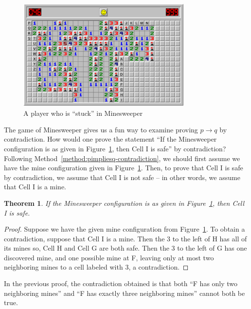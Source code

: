 \documentclass{book}
\newcounter{ekcounter}%
\theoremstyle{ekimcustom}
\newtheorem{theorem}[ekcounter]{Theorem}
\begin{document}
\begin{figure}[hbt]
\begin{center}
\includegraphics[width=0.78\textwidth]{minesweeper01}
\end{center}
\caption{A player who is ``stuck'' in Minesweeper}\label{figure:minesweeper01}
\end{figure}

The game of Minesweeper gives us a fun way to examine proving $p \rightarrow q$ by contradiction. How would one prove the statement ``If the Minesweeper configuration is as given in Figure~\ref{figure:minesweeper01}, then Cell I is safe'' by contradiction? Following Method~\ref{method:pimpliesq-contradiction}, we should first assume we have the mine configuration given in Figure~\ref{figure:minesweeper01}. Then, to prove that Cell I is safe by contradiction, we assume that Cell I is not safe -- in other words, we assume that Cell I is a mine.
\begin{theorem}
If the Minesweeper configuration is as given in Figure~\ref{figure:minesweeper01}, then Cell I is safe.
\end{theorem}
\begin{proof}
Suppose we have the given mine configuration from Figure~\ref{figure:minesweeper01}. To obtain a contradiction, suppose that Cell I is a mine. Then the 3 to the left of H has all of its mines so, Cell H and Cell G are both safe. Then the 3 to the left of G has one discovered mine, and one possible mine at F, leaving only at most two neighboring mines to a cell labeled with 3, a contradiction.
\end{proof}
In the previous proof, the contradiction obtained is that both ``F has only two neighboring mines'' and ``F has exactly three neighboring mines'' cannot both be true.

\end{document}
